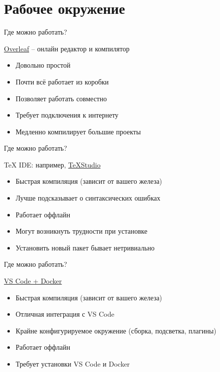\section{Рабочее окружение}


\newcommand\pro{\item[$+$]}
\newcommand\con{\item[$-$]}

\begin{frame}{Где можно работать?}

\href{https://overleaf.com}{\color{blue} Overleaf} -- онлайн редактор и компилятор

\begin{itemize}
    \pro Довольно простой
    \pro Почти всё работает из коробки
    \pro Позволяет работать совместно
    \con Требует подключения к интернету
    \con Медленно компилирует большие проекты
\end{itemize}

\end{frame}


\begin{frame}{Где можно работать?}

TeX IDE: например, 
\href{https://www.texstudio.org/}{\color{blue} TeXStudio}

\begin{itemize}
    \pro Быстрая компиляция (зависит от вашего железа)
    \pro Лучше подсказывает о синтаксических ошибках
    \pro Работает оффлайн
    \con Могут возникнуть трудности при установке
    \con Установить новый пакет бывает нетривиально
\end{itemize}

\end{frame}


\begin{frame}{Где можно работать?}

\href{https://github.com/TmLev/tex-template}{\color{blue} VS Code + Docker}

\begin{itemize}
    \pro Быстрая компиляция (зависит от вашего железа)
    \pro Отличная интеграция с VS Code
    \pro Крайне конфигурируемое окружение (сборка, подсветка, плагины)
    \pro Работает оффлайн
    \con Требует установки VS Code и Docker
\end{itemize}

\end{frame}

